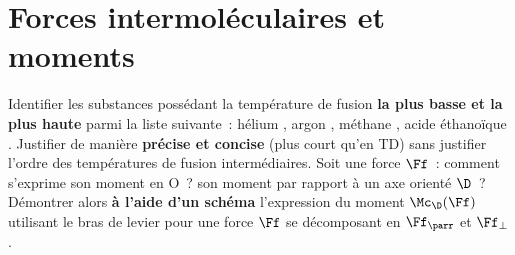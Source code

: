 \documentclass[a4paper, 10pt, final, garamond]{book}
\begin{document}
\setcounter{chapter}{18}


\chapter{Forces intermoléculaires et moments}

\begin{enumerate}[label=\sqenumi]
	Identifier les substances possédant la température de fusion \textbf{la plus
		basse et la plus haute} parmi la liste suivante~: hélium , argon
	, méthane , acide éthanoïque . Justifier de manière
	\textbf{précise et concise} (plus court qu'en TD) sans justifier l'ordre des
	températures de fusion intermédiaires.
	\smallbreak
	Soit une force $\Ff$~: comment s'exprime son moment en O~? son moment par
	rapport à un axe orienté $\D$~? Démontrer alors \textbf{à l'aide d'un schéma}
	l'expression du moment $\Mc_{\D}(\Ff)$ utilisant le bras de levier pour une
	force $\Ff$ se décomposant en $\Ff_{\parr}$ et $\Ff_{\perp}$.
	\smallbreak
	\vspace{-15pt}
	\begin{isd}
		\vspace{-15pt}
\end{isd}
\end{enumerate}
\end{document}
